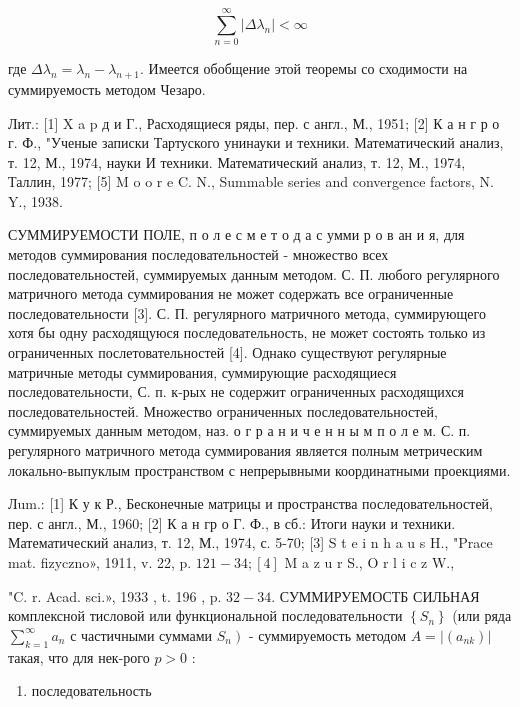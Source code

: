 \documentclass[10pt]{article}
\begin{document}
\[

\sum_{n=0}^{\infty}\left|\Delta \lambda_{n}\right|<\infty

\]



где $\Delta \lambda_{n}=\lambda_{n}-\lambda_{n+1}$. Имеется обобщение этой теоремы со сходимости на суммируемость методом Чезаро.



Лит.: [1] X a p д и Г., Расходящиеся ряды, пер. с англ., М., 1951; [2] К а н г р о г. Ф., "Ученые записки Тартуского унинауки и техники. Математический анализ, т. 12, М., 1974, науки И техники. Математический анализ, т. 12, М., 1974, Таллин, 1977; [5] M o o r e C. N., Summable series and convergence factors, N. Y., 1938.



СУММИРУЕМОСТИ ПОЛЕ, п о л $е$ с м е т о д а с умми р о в ан и я, для методов суммирования последовательностей - множество всех последовательностей, суммируемых данным методом. С. П. любого регулярного матричного метода суммирования не может содержать все ограниченные последовательности [3]. С. П. регулярного матричного метода, суммирующего хотя бы одну расходящуюся последовательность, не может состоять только из ограниченных послетовательностей [4]. Однако существуют регулярные матричные методы суммирования, суммирующие расходящиеся последовательности, С. п. к-рых не содержит ограниченных расходящихся последовательностей. Множество ограниченных последовательностей, суммируемых данным методом, наз. о г р а н и ч е н н ы м п о л е м. С. п. регулярного матричного метода суммирования является полным метрическим локально-выпуклым пространством с непрерывными координатными проекциями.



Лum.: [1] К у к Р., Бесконечные матрицы и пространства последовательностей, пер. с англ., М., 1960; [2] К а н гр о Г. Ф., в сб.: Итоги науки и техники. Математический анализ, т. 12, М., 1974, с. 5-70; [3] S t e i n h a u s H., "Prace mat. fizyczno», 1911, v. 22, p. $121-34 ;[4]$ M a z u r S., O r l i c z W.,

"C. r. Acad. sci.», 1933 , t. 196 , p. $32-34$. СУММИРУЕМОСТБ СИЛЬНАЯ комплексной тисловой или функциональной последовательности $\left\{S_{n}\right\}$ (или ряда $\sum_{k=1}^{\infty} a_{n}$ с частичными суммами $\left.S_{n}\right)$ - суммируемость методом $A=\left|\left(a_{n k}\right)\right|$ такая, что для нек-рого $p>0$ :



\begin{enumerate}

  \item последовательность

\end{enumerate}
\end{document}
